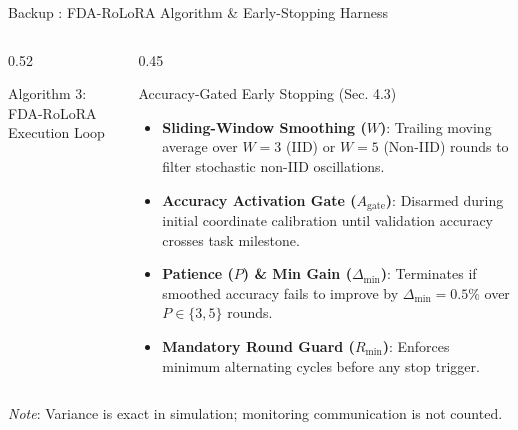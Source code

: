 \documentclass[aspectratio=169]{beamer}
\begin{document}
\begin{frame}[noframenumbering, label=backup_algo]{Backup : FDA-RoLoRA Algorithm \& Early-Stopping Harness}
\begin{columns}[t]
\begin{column}{0.52\textwidth}
\begin{block}{Algorithm 3: FDA-RoLoRA Execution Loop}
\begin{enumerate}
\begin{itemize}
                    \end{itemize}
                \end{enumerate}
            \end{block}
        \end{column}
        \begin{column}{0.45\textwidth}
            \begin{block}{Accuracy-Gated Early Stopping (Sec. 4.3)}
                \begin{itemize}
                    \item \textbf{Sliding-Window Smoothing ($W$)}: Trailing moving average over $W=3$ (IID) or $W=5$ (Non-IID) rounds to filter stochastic non-IID oscillations.
                    \item \textbf{Accuracy Activation Gate ($A_{\text{gate}}$)}: Disarmed during initial coordinate calibration until validation accuracy crosses task milestone.
                    \item \textbf{Patience ($P$) \& Min Gain ($\Delta_{\min}$)}: Terminates if smoothed accuracy fails to improve by $\Delta_{\min} = 0.5\%$ over $P \in \{3, 5\}$ rounds.
                    \item \textbf{Mandatory Round Guard ($R_{\min}$)}: Enforces minimum alternating cycles before any stop trigger.
                \end{itemize}
            \end{block}
        \end{column}
    \end{columns}
    \vspace{0.2em}\par{\tiny \textit{Note}: Variance is exact in simulation; monitoring communication is not counted.}
\end{frame}
\end{document}

